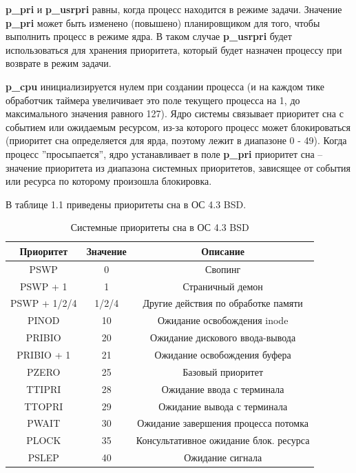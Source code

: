 \textbf{p\_pri} и \textbf{p\_usrpri} равны, когда процесс находится в режиме задачи.
Значение \textbf{p\_pri} может быть изменено (повышено) планировщиком для того, чтобы выполнить процесс в режиме ядра. 
В таком случае \textbf{p\_usrpri} будет использоваться для хранения приоритета, который будет назначен
процессу при возврате в режим задачи.

\textbf{p\_cpu} инициализируется нулем при создании процесса (и на каждом тике обработчик таймера увеличивает это поле текущего процесса на 1, до
максимального значения равного 127).
Ядро системы связывает приоритет сна с событием или ожидаемым ресурсом, из-за которого процесс может блокироваться (приоритет сна определяется для ярда, поэтому лежит в диапазоне 0 - 49). 
Когда процесс ”просыпается”, ядро устанавливает в поле \textbf{p\_pri} приоритет сна – значение приоритета из диапазона системных приоритетов, зависящее от события или ресурса по которому произошла блокировка.

В таблице 1.1 приведены приоритеты сна в ОС 4.3 BSD.

\begin{table}[h]
	\caption{Системные приоритеты сна в ОС 4.3 BSD}
	\begin{center}
		\begin{tabular}{| c | c | c |} 
			\hline
			\textbf{Приоритет} & \textbf{Значение} & \textbf{Описание}\\
			\hline
			PSWP & 0 & {Свопинг} \\
			\hline
			{PSWP + 1} & 1 & {Страничный демон}\\
			\hline
			{PSWP + 1/2/4} & 1/2/4 & {Другие действия по обработке памяти} \\
			\hline
			{PINOD} & 10 & {Ожидание освобождения inode}\\
			\hline
			{PRIBIO} & 20 & {Ожидание дискового ввода-вывода}\\
			\hline
			{PRIBIO + 1} & 21 & {Ожидание освобождения буфера}\\
			\hline
			{PZERO} & 25 & {Базовый приоритет}\\
			\hline
			{TTIPRI} & 28 & {Ожидание ввода с терминала}\\
			\hline
			{TTOPRI} & 29 & {Ожидание вывода с терминала}\\
			\hline
			{PWAIT} & 30 & {Ожидание завершения процесса потомка} \\
			\hline
			{PLOCK} & 35 & {Консультативное ожидание блок. ресурса}\\
			\hline
			{PSLEP} & 40 & {Ожидание сигнала}\\
			\hline
		\end{tabular}
	\end{center}
\end{table}

